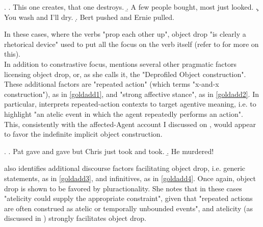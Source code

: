 \ex. \label{mittwochhabitualD} \a. \label{mittwochhabitual9} This one creates, that one destroys.
\b. \label{mittwochhabitual10} A few people bought, most just looked.
\c. \label{cotehabitual1} You wash and I'll dry.
\d. \label{cotehabitual2} Bert pushed and Ernie pulled.


In these cases, where the verbs "prop each other up", object drop "is clearly a rhetorical device" used to put all the focus on the verb itself (refer to  for more on this).\\
In addition to constrastive focus, \textcite[196-197]{goldberg2006constructions} mentions several other pragmatic factors licensing object drop, or, as she calls it, the "Deprofiled Object construction". These additional factors are "repeated action" (which \textcite{Rissman2016} terms "x-and-x construction"), as in \ref{goldadd1}, and "strong affective stance", as in \ref{goldadd2}. In particular, \textcite{Rissman2016} interprets repeated-action contexts to target agentive meaning, i.e. to highlight "an atelic event in which the agent repeatedly performs an action". This, consistently with the affected-Agent account I discussed on , would appear to favor the indefinite implicit object construction.

\ex. \label{goldadd} \a. \label{goldadd1} Pat gave and gave but Chris just took and took.
\b. \label{goldadd2} He murdered!

\textcite[506-514]{Goldberg2001} also identifies additional discourse factors facilitating object drop, i.e. generic statements, as in \ref{goldadd3}, and infinitives, as in \ref{goldadd4}. Once again, object drop is shown to be favored by pluractionality. She notes \parencite[507]{Goldberg2001} that in these cases "atelicity could supply the appropriate constraint", given that "repeated actions are often construed as atelic or temporally unbounded events", and atelicity (as discussed in ) strongly facilitates object drop.

